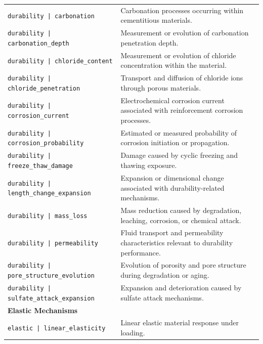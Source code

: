 \documentclass[11pt]{book}
\begin{document}
{\begin{longtable}{p{}p{}}
\texttt{durability | carbonation} &
Carbonation processes occurring within cementitious materials. \\

\texttt{durability | carbonation\_depth} &
Measurement or evolution of carbonation penetration depth. \\

\texttt{durability | chloride\_content} &
Measurement or evolution of chloride concentration within the material. \\

\texttt{durability | chloride\_penetration} &
Transport and diffusion of chloride ions through porous materials. \\

\texttt{durability | corrosion\_current} &
Electrochemical corrosion current associated with reinforcement corrosion processes. \\

\texttt{durability | corrosion\_probability} &
Estimated or measured probability of corrosion initiation or propagation. \\

\texttt{durability | freeze\_thaw\_damage} &
Damage caused by cyclic freezing and thawing exposure. \\

\texttt{durability | length\_change\_expansion} &
Expansion or dimensional change associated with durability-related mechanisms. \\

\texttt{durability | mass\_loss} &
Mass reduction caused by degradation, leaching, corrosion, or chemical attack. \\

\texttt{durability | permeability} &
Fluid transport and permeability characteristics relevant to durability performance. \\

\texttt{durability | pore\_structure\_evolution} &
Evolution of porosity and pore structure during degradation or aging. \\

\texttt{durability | sulfate\_attack\_expansion} &
Expansion and deterioration caused by sulfate attack mechanisms. \\

\hline
\multicolumn{2}{l}{\textbf{Elastic Mechanisms}}\\
\hline

\texttt{elastic | linear\_elasticity} &
Linear elastic material response under loading. \\


\end{longtable}}
\end{document}
